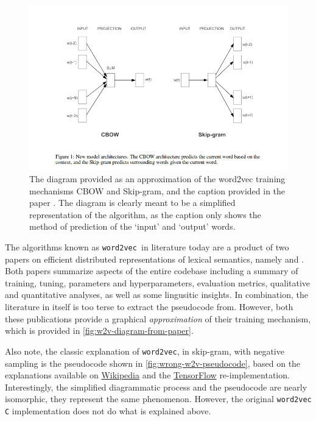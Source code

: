 \documentclass[11pt]{book}
\newcommand{\wtov}{\texttt{word2vec }}
\begin{document}
\begin{figure}[htb]
  \includegraphics[width=\textwidth]{./w2v-diagram-from-paper.png}
  \caption{The diagram provided as an approximation of the word2vec training
    mechanisms CBOW and Skip-gram, and the caption provided in the paper
    \cite{mikolov2013efficient}. The diagram is clearly meant to be a
    simplified representation of the algorithm, as the caption only shows the
    method of prediction of the `input' and `output' words.}
  \label{fig:w2v-diagram-from-paper}
\end{figure}

The algorithms known as \wtov in literature today are a product of two papers on
efficient distributed representations of lexical semantics, namely
\cite{mikolov2013efficient} and \cite{mikolov2013distributed}. Both papers
summarize aspects of the entire codebase including a summary of training,
tuning, parameters and hyperparameters, evaluation metrics, qualitative and
quantitative analyses, as well as some lingusitic insights. In combination, the
literature in itself is too terse to extract the pseudocode from. However, both
these publications provide a graphical \textit{approximation} of their training
mechanism, which is provided in \autoref{fig:w2v-diagram-from-paper}.

Also note, the classic explanation of \texttt{word2vec}, in skip-gram, with negative
sampling is the pseudocode shown in \autoref{fig:wrong-w2v-pseudocode}, based on
the explanations available on \href{https://en.wikipedia.org/wiki/Word2vec#Training_algorithm}{Wikipedia}
and the \href{https://www.tensorflow.org/tutorials/representation/word2vec}{TensorFlow} re-implementation.
Interestingly, the simplified diagrammatic process and
the pseudocode are nearly isomorphic, they represent the same phenomenon.
However, the original \wtov \texttt{C} implementation does not do what is explained above.
\end{document}
